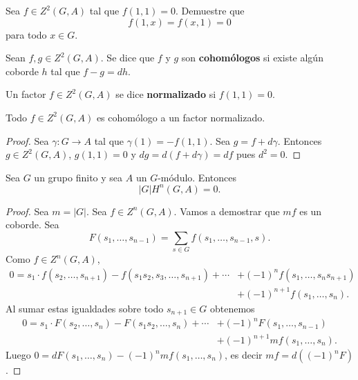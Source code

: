 \begin{exercise}
	Sea $f\in Z^2(G,A)$ tal que $f(1,1)=0$. Demuestre que 
	\[
	f(1,x)=f(x,1)=0
	\]
	para todo $x\in G$.
\end{exercise}


\begin{definition}
	Sean $f,g\in Z^2(G,A)$. Se dice que $f$ y $g$ son \textbf{cohomólogos} si
	existe algún coborde $h$ tal que $f-g=dh$. 
\end{definition}

Un factor $f\in Z^2(G,A)$ se dice \textbf{normalizado} si $f(1,1)=0$. 

\begin{lemma}
	\label{lemma:normalizado}
	Todo $f\in Z^2(G,A)$ es cohomólogo a un factor normalizado. 
\end{lemma}

\begin{proof}
	Sea $\gamma\colon G\to A$ tal que $\gamma(1)=-f(1,1)$. Sea
	$g=f+d\gamma$. Entonces $g\in Z^2(G,A)$, $g(1,1)=0$ y $dg=d(f+d\gamma)=df$ pues
	$d^2=0$. 
\end{proof}

\begin{theorem}
	\label{theorem:|G|H^2=0}
	Sea $G$ un grupo finito y sea $A$ un $G$-módulo. Entonces 
	\[
	|G|H^n(G,A)=0.
	\]
\end{theorem}

\begin{proof}
	Sea $m=|G|$. Sea $f\in Z^n(G,A)$. Vamos a demostrar que $mf$ es un coborde. Sea 
	\[
	F(s_1,\dots,s_{n-1})=\sum_{s\in G}f(s_1,\dots,s_{n-1},s).
	\]
	Como $f\in Z^n(G,A)$, 
	\begin{align*}
		0=s_1\cdot f(s_2,\dots,s_{n+1})-f(s_1s_2,s_3,\dots,s_{n+1})+\cdots&+(-1)^nf(s_1,\dots,s_ns_{n+1})\\
		&+(-1)^{n+1}f(s_1,\dots,s_n).
	\end{align*}
	Al sumar estas igualdades sobre todo $s_{n+1}\in G$ obtenemos 
	\begin{align*}
		0=s_1\cdot F(s_2,\dots,s_n)-F(s_1s_2,\dots,s_n)+\cdots&+(-1)^nF(s_1,\dots,s_{n-1})\\
		&+(-1)^{n+1}mf(s_1,\dots,s_n).
	\end{align*}
	Luego $0=dF(s_1,\dots,s_n)-(-1)^nmf(s_1,\dots,s_n)$, es decir $mf=d(
	(-1)^nF)$.
\end{proof}

